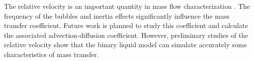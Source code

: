 \documentclass{article}
\begin{document}
The relative velocity is an important quantity in mass flow characterization
\cite{kreutzer-taylor,yue-mass}. The frequency of the bubbles \cite{kreutzer-taylor} and 
inertia effects \citet{heil-bretherton} significantly influence the mass transfer coefficient. 
Future work is planned to study this coefficient and calculate the associated advection-diffusion coefficient.
 However, preliminary
studies of the relative velocity show that the binary liquid model can simulate accurately some
characteristics of mass transfer.

\end{document}
